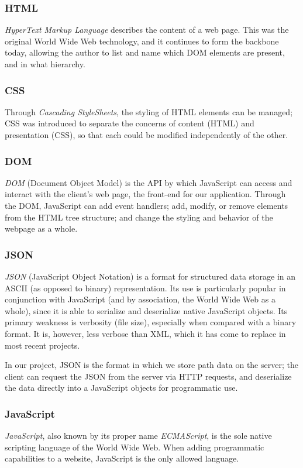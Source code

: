 \subsubsection{HTML}
\emph{HyperText Markup Language} describes the content of a web page. This was the original World Wide Web technology, and it continues to form the backbone today, allowing the author to list and name which DOM elements are present, and in what hierarchy.\cite{html}
\subsubsection{CSS}
Through \emph{Cascading StyleSheets}, the styling of HTML elements can be managed; CSS was introduced to separate the concerns of content (HTML) and presentation (CSS), so that each could be modified independently of the other.\cite{css}
\subsubsection{DOM}
\emph{DOM} (Document Object Model) is the API by which JavaScript can access and interact with the client's web page, the front-end for our application. Through the DOM, JavaScript can add event handlers; add, modify, or remove elements from the HTML tree structure; and change the styling and behavior of the webpage as a whole.\cite{dom}
\subsubsection{JSON}
\emph{JSON} (JavaScript Object Notation) is a format for structured data storage in an ASCII (as opposed to binary) representation.\cite{json} Its use is particularly popular in conjunction with JavaScript (and by association, the World Wide Web as a whole), since it is able to serialize and deserialize native JavaScript objects. Its primary weakness is verbosity (file size), especially when compared with a binary format. It is, however, less verbose than XML, which it has come to replace in most recent projects.\par
In our project, JSON is the format in which we store path data on the server; the client can request the JSON from the server via HTTP requests, and deserialize the data directly into a JavaScript objects for programmatic use.
\subsubsection{JavaScript}
\emph{JavaScript}, also known by its proper name \emph{ECMAScript}, is the sole native scripting language of the World Wide Web. When adding programmatic capabilities to a website, JavaScript is the only allowed language.\cite{javascript}
